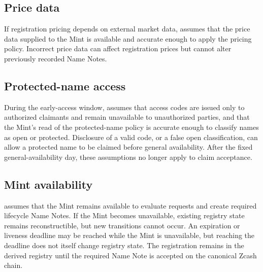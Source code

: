 \subsection{Price data}

If registration pricing depends on external market data, \zns{} assumes that the price data supplied to the Mint is available and accurate enough to apply the pricing policy. Incorrect price data can affect registration prices but cannot alter previously recorded Name Notes.

\subsection{Protected-name access}

During the early-access window, \zns{} assumes that access codes are issued only to authorized claimants and remain unavailable to unauthorized parties, and that the Mint's read of the protected-name policy is accurate enough to classify names as open or protected. Disclosure of a valid code, or a false open classification, can allow a protected name to be claimed before general availability. After the fixed general-availability day, these assumptions no longer apply to claim acceptance.

\subsection{Mint availability}

\zns{} assumes that the Mint remains available to evaluate requests and create required lifecycle  Name Notes. If the Mint becomes unavailable, existing registry state remains reconstructible, but new transitions cannot occur. An expiration or liveness deadline may be reached while the Mint is unavailable, but reaching the deadline does not itself change registry state. The registration remains in the derived registry until the required  Name Note is accepted on the canonical Zcash chain.
